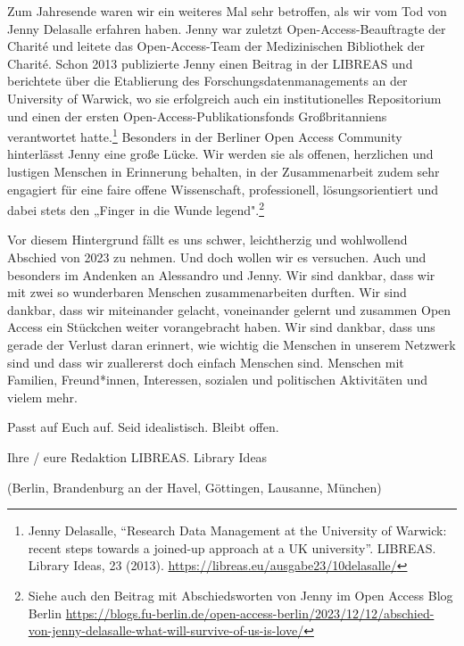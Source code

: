 \documentclass[a4paper,
fontsize=11pt,
oneside,
numbers=noperiodatend,
parskip=half-,
bibliography=totoc,
final
]{scrartcl}
\begin{document}
Zum Jahresende waren wir ein weiteres Mal sehr betroffen, als wir vom
Tod von Jenny Delasalle erfahren haben. Jenny war zuletzt
Open-Access-Beauftragte der Charité und leitete das Open-Access-Team der
Medizinischen Bibliothek der Charité. Schon 2013 publizierte Jenny einen
Beitrag in der LIBREAS und berichtete über die Etablierung des
Forschungsdatenmanagements an der University of Warwick, wo sie
erfolgreich auch ein institutionelles Repositorium und einen der ersten
Open-Access-Publikationsfonds Großbritanniens verantwortet
hatte.\footnote{Jenny Delasalle, \enquote{Research Data Management at
  the University of Warwick: recent steps towards a joined-up approach
  at a UK university}. LIBREAS. Library Ideas, 23 (2013).
  \url{https://libreas.eu/ausgabe23/10delasalle/}} Besonders in der
Berliner Open Access Community hinterlässt Jenny eine große Lücke. Wir
werden sie als offenen, herzlichen und lustigen Menschen in Erinnerung
behalten, in der Zusammenarbeit zudem sehr engagiert für eine faire
offene Wissenschaft, professionell, lösungsorientiert und dabei stets
den „Finger in die Wunde legend".\footnote{Siehe auch den Beitrag mit
  Abschiedsworten von Jenny im Open Access Blog Berlin
  \url{https://blogs.fu-berlin.de/open-access-berlin/2023/12/12/abschied-von-jenny-delasalle-what-will-survive-of-us-is-love/}}

Vor diesem Hintergrund fällt es uns schwer, leichtherzig und wohlwollend
Abschied von 2023 zu nehmen. Und doch wollen wir es versuchen. Auch und
besonders im Andenken an Alessandro und Jenny. Wir sind dankbar, dass
wir mit zwei so wunderbaren Menschen zusammenarbeiten durften. Wir sind
dankbar, dass wir miteinander gelacht, voneinander gelernt und zusammen
Open Access ein Stückchen weiter vorangebracht haben. Wir sind dankbar,
dass uns gerade der Verlust daran erinnert, wie wichtig die Menschen in
unserem Netzwerk sind und dass wir zuallererst doch einfach Menschen
sind. Menschen mit Familien, Freund*innen, Interessen, sozialen und
politischen Aktivitäten und vielem mehr.

Passt auf Euch auf. Seid idealistisch. Bleibt offen.

Ihre / eure Redaktion LIBREAS. Library Ideas

(Berlin, Brandenburg an der Havel, Göttingen, Lausanne, München)

\end{document}
